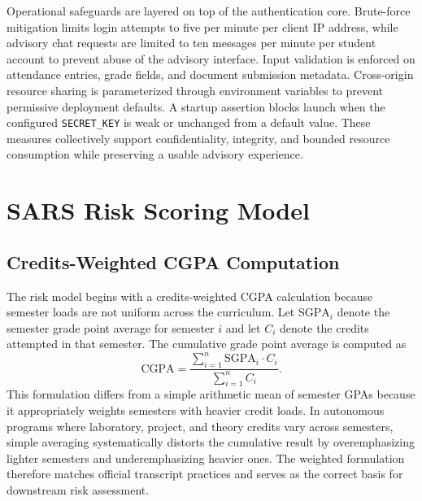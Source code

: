 \documentclass[conference]{IEEEtran}
\begin{document}
Operational safeguards are layered on top of the authentication core. Brute-force mitigation limits login attempts to five per minute per client IP address, while advisory chat requests are limited to ten messages per minute per student account to prevent abuse of the advisory interface. Input validation is enforced on attendance entries, grade fields, and document submission metadata. Cross-origin resource sharing is parameterized through environment variables to prevent permissive deployment defaults. A startup assertion blocks launch when the configured \texttt{SECRET\_KEY} is weak or unchanged from a default value. These measures collectively support confidentiality, integrity, and bounded resource consumption while preserving a usable advisory experience.

\section{SARS Risk Scoring Model}
\subsection{Credits-Weighted CGPA Computation}
The risk model begins with a credits-weighted CGPA calculation because semester loads are not uniform across the curriculum. Let $\mathrm{SGPA}_i$ denote the semester grade point average for semester $i$ and let $C_i$ denote the credits attempted in that semester. The cumulative grade point average is computed as
\begin{equation}
\mathrm{CGPA} = \frac{\sum_{i=1}^{n} \mathrm{SGPA}_i \cdot C_i}{\sum_{i=1}^{n} C_i}.
\label{eq:cgpa}
\end{equation}
This formulation differs from a simple arithmetic mean of semester GPAs because it appropriately weights semesters with heavier credit loads. In autonomous programs where laboratory, project, and theory credits vary across semesters, simple averaging systematically distorts the cumulative result by overemphasizing lighter semesters and underemphasizing heavier ones. The weighted formulation therefore matches official transcript practices and serves as the correct basis for downstream risk assessment.
\end{document}
